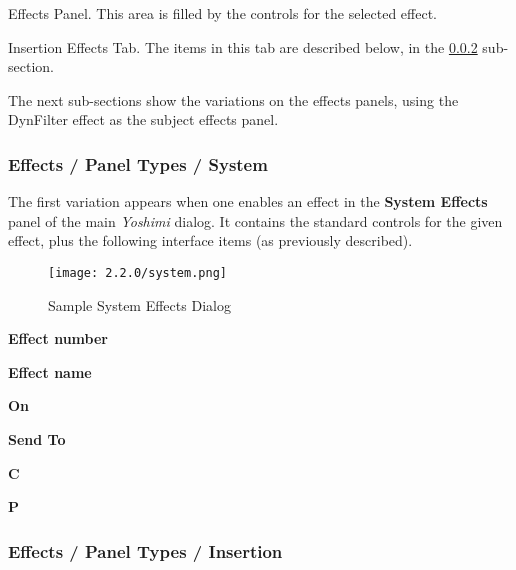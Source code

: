    Effects Panel.
   This area is filled by the controls for the selected effect.

   Insertion Effects Tab.
   The items in this tab are described below,
   in the \ref{subsubsec:effects_paneltypes_insertion}
   sub-section.

   \iffalse
   VVVV How did this get here? It's quite out of place!
   \itempar{Reports}{effects!reports}
   Effects Reports.

\begin{figure}[H]
   \centering
   \texttt{[image: effects-panel/reports.jpg]}
   \caption{Effects / Reports}
   \label{fig:effects_reports}
\end{figure}
\fi

   The next sub-sections show the variations on the effects panels, using the
   DynFilter effect as the subject effects panel.

\subsubsection{Effects / Panel Types / System }
\label{subsubsec:effects_paneltypes_system}

   The first variation
   appears when one enables an effect in the
   \textbf{System Effects}
   panel of the main \textsl{Yoshimi} dialog.  It contains the standard
   controls for the given effect, plus the following interface items
   (as previously described).

\begin{figure}[H]
   \centering
   \texttt{[image: 2.2.0/system.png]}
   \caption{Sample System Effects Dialog}
   \label{fig:sample_system_effects_dialog}
\end{figure}

   \begin{enumber}
      \item \textbf{Effect number}
      \item \textbf{Effect name}
      \item \textbf{On}
      \item \textbf{Send To}
      \item \textbf{C}
      \item \textbf{P}
   \end{enumber}

\subsubsection{Effects / Panel Types / Insertion }
\label{subsubsec:effects_paneltypes_insertion}

